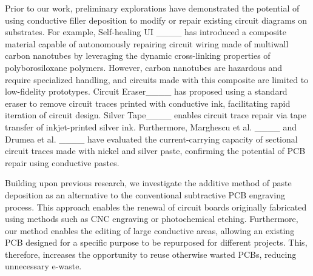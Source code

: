 Prior to our work, preliminary explorations have demonstrated the potential of using conductive filler deposition to modify or repair existing circuit diagrams on substrates.
For example, Self-healing UI ____ has introduced a composite material
capable of autonomously repairing circuit wiring made of multiwall carbon nanotubes by leveraging the dynamic cross-linking properties of polyborosiloxane polymers.
However, carbon nanotubes are hazardous and require specialized handling, and circuits made with this composite are limited to low-fidelity prototypes.
Circuit Eraser____ has proposed using a standard eraser to remove circuit traces printed with conductive ink, facilitating rapid iteration of circuit design.
Silver Tape____ enables circuit trace repair via tape transfer of inkjet-printed silver ink.
Furthermore, Marghescu et al. ____ and Drumea et al. ____ have evaluated the current-carrying capacity of sectional circuit traces made with nickel and silver paste, confirming the potential of PCB repair using conductive pastes.



Building upon previous research, we investigate the additive method of paste deposition as an alternative to the conventional subtractive PCB engraving process.
This approach enables the renewal of circuit boards originally fabricated using methods such as CNC engraving or photochemical etching. 
Furthermore, our method enables the editing of large conductive areas, allowing an existing PCB designed for a specific purpose to be repurposed for different projects. 
This, therefore, increases the opportunity to reuse otherwise wasted PCBs, reducing unnecessary e-waste.